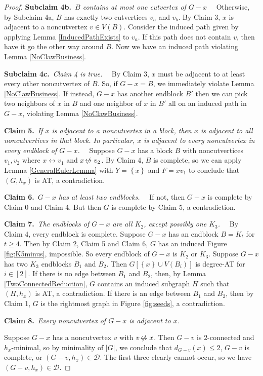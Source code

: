 \documentclass[12pt]{article}
\theoremstyle{plain}
\theoremstyle{definition}
\theoremstyle{remark}
\newcommand{\fancy}[1]{\mathcal{#1}}
\newcommand{\D}{\fancy{D}}
\newcommand{\set}[1]{\left\{ #1 \right\}}
\newcommand{\card}[1]{\left|#1\right|}
\newcommand{\irange}[1]{\left[#1\right]}
\def\adj{\leftrightarrow}
\def\nonadj{\not\!\leftrightarrow}
\def\D{\fancy{D}}
\newcommand{\claim}[2]{{\bf Claim #1.}~{\it #2}~~}
\newcommand{\subclaim}[2]{{\bf Subclaim #1.}~{\it #2}~~}
\def\adj{\leftrightarrow}
\begin{document}
\begin{proof}
	  \subclaim{4b}{$B$ contains at most one cutvertex of $G-x$}
	  Otherwise, by Subclaim 4a, $B$ has exactly two cutvertices $v_a$ and $v_b$.  By Claim 3, $x$ is adjacent to a noncutvertex $v \in V(B)$.  Consider the induced path given by applying Lemma \ref{InducedPathExists} to $v_a$.  If this path does not contain $v$, then have it go the other way around $B$.  Now we have an induced path violating Lemma \ref{NoClawBusiness}. 
	
	  \subclaim{4c}{Claim 4 is true.}
	  By Claim 3, $x$ must be adjacent to at least every other noncutvertex of $B$. So, if $G-x = B$, we immediately violate Lemma \ref{NoClawBusiness}.  If instead, $G-x$ has another endblock $B'$ then we can pick two neighbors of $x$ in $B$ and one neighbor of $x$ in $B'$ all on an induced path in $G-x$, violating Lemma \ref{NoClawBusiness}.
	 
	 \claim{5}{If $x$ is adjacent to a noncutvertex in a block, then $x$ is adjacent to all noncutvertices in that block. In particular, $x$ is adjacent to every noncutvertex in every endblock of $G-x$.}
	  Suppose $G-x$ has a block $B$ with noncutvertices $v_1,v_2$ where $x \adj v_1$ and $x \nonadj v_2$.  By Claim 4, $B$ is complete, so we can apply Lemma \ref{GeneralEulerLemma} with $Y = \set{x}$ and $F = xv_1$ to conclude that $(G,h_x)$ is AT, a contradiction.  
	 	 
	 \claim{6}{$G-x$ has at least two endblocks.}
   	  If not, then $G-x$ is complete by Claim 0 and Claim 4.  But then $G$ is complete by Claim 5, a contradiction.
	 
	 \claim{7}{The endblocks of $G-x$ are all $K_2$, except possibly one $K_3$.}
	 By Claim 4, every endblock is complete.  Suppose $G-x$ has an endblock $B = K_t$ for $t \ge 4$.  Then by Claim 2, Claim 5 and Claim 6, $G$ has an induced Figure \ref{fig:K5minus}, impossible.  So every endblock of $G-x$ is $K_2$ or $K_3$.  Suppose $G-x$ has two $K_3$ endblocks $B_1$ and $B_2$.  Then $G[\set{x} \cup V(B_i)]$ is degree-AT for $i \in \irange{2}$.  If there is no edge between $B_1$ and $B_2$, then, by Lemma \ref{TwoConnectedReduction}, $G$ contains an induced subgraph $H$ such that $(H,h_x)$ is AT, a contradiction.  If there is an edge between $B_1$ and $B_2$, then by Claim 1, $G$ is the rightmost graph in Figure \ref{fig:seeds}, a contradiction.

	 \claim{8}{Every noncutvertex of $G-x$ is adjacent to $x$.}
	 
	 Suppose $G-x$ has a noncutvertex $v$ with $v \nonadj x$. Then $G-v$ is $2$-connected and $h_x$-minimal, so by minimality of $\card{G}$, we conclude that $d_{G-v}(x) \le 2$, $G-v$ is complete, or $(G-v,h_x) \in \D$.  The first three clearly cannot occur, so we have $(G-v,h_x) \in \D$.  
	 

\end{proof}
\end{document}
